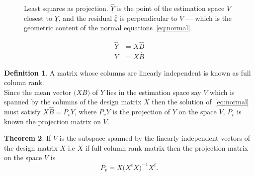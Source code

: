 \documentclass[11pt,a4paper]{article}
\theoremstyle{definition}
\newtheorem{thm}{Theorem}[subsection]
\newtheorem{defn}[thm]{Definition}
\begin{document}
\begin{figure}[H]
\centering
{}
\caption{Least squares as projection. $\widehat{\underline{Y}}$ is the point of the estimation space $V$ closest to $\underline{Y}$, and the residual $\widehat{\underline{\varepsilon}}$ is perpendicular to $V$ --- which is the geometric content of the normal equations~\eqref{eq:normal}.}
\label{fig:projection}
\end{figure}
\begin{align*}
\widehat{Y} & = X\widehat{B}\\
Y & = X\widehat{B}
\end{align*}


\begin{defn}\label{res:defn:2.3.1}
A matrix whose columns are linearly independent is known as full column rank.\\

Since the mean vector $\big(XB\big)$ of $Y$ lies in the estimation space say $V$ which is spanned by the columns of the design matrix $X$ then the solution of~\eqref{eq:normal} must satisfy $X\widehat{B}=P_vY$, where $P_vY$ is the projection of $Y$ on the space $V$, $P_v$ is known the projection matrix on $V$.
\end{defn}


\begin{thm}\label{res:thm:2.3.2}
If $V$ is the subspace spanned by the linearly independent vectors of the design matrix $X$ i.e $X$ if full column rank matrix then the projection matrix on the space $V$ is $$P_v=X\big(X^tX\big)^{-1}X^t.$$
\end{thm}
\end{document}

